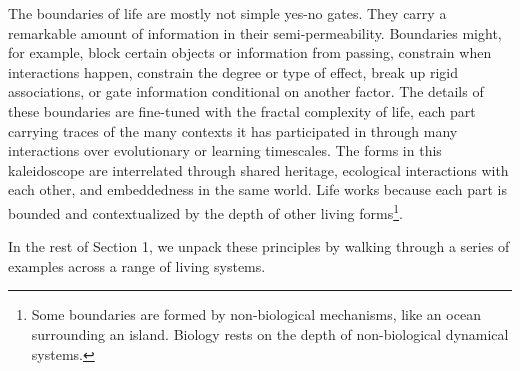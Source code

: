 \documentclass[12pt]{article}
\begin{document}



The boundaries of life are mostly not simple yes-no gates. They carry a remarkable amount of information in their semi-permeability. Boundaries might, for example, block certain objects or information from passing, constrain when interactions happen, constrain the degree or type of effect, break up rigid associations, or gate information conditional on another factor. The details of these boundaries are fine-tuned with the fractal complexity of life, each part carrying traces of the many contexts it has participated in through many interactions over evolutionary or learning timescales. The forms in this kaleidoscope are interrelated through shared heritage, ecological interactions with each other, and embeddedness in the same world. Life works because each part is bounded and contextualized by the depth of other living forms\footnote{Some boundaries are formed by non-biological mechanisms, like an ocean surrounding an island. Biology rests on the depth of non-biological dynamical systems.}. 

In the rest of Section 1, we unpack these principles by walking through a series of examples across a range of living systems.





\end{document}
